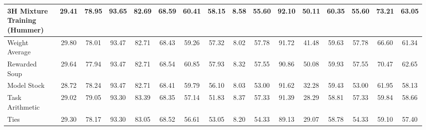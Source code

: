 \begin{table*}
{\begin{tabular}{lcccccccc|c|cc|cccc}
      3H Mixture Training (Hummer)           & 29.41                                     & 78.95            & 93.65                                      & 82.69                                  & 68.59                                 & 60.41                                   & 58.15                         & 8.58     & 55.60           & 92.10           & 50.11       & 60.35 & 55.60 & 73.21 & 63.05             \\ \midrule
      Weight Average                         & 29.80                                     & 78.01            & 93.47                                      & 82.71                                  & 68.43                                 & 59.26                                   & 57.32                         & 8.02     & 57.78           & 91.72           & 41.48       & 59.63 & 57.78 & 66.60 & 61.34             \\
      Rewarded Soup                          & 29.64                                     & 77.94            & 93.47                                      & 82.71                                  & 68.54                                 & 60.85                                   & 57.93                         & 8.32     & 57.55           & 90.86           & 50.08       & 59.93 & 57.55 & 70.47 & 62.65             \\
      Model Stock                            & 28.72                                     & 78.24            & 93.47                                      & 82.71                                  & 68.41                                 & 59.79                                   & 56.10                         & 8.03     & 53.00           & 91.62           & 32.28       & 59.43 & 53.00 & 61.95 & 58.13             \\
      Task Arithmetic                        & 29.02                                     & 79.05            & 93.30                                      & 83.39                                  & 68.35                                 & 57.14                                   & 51.83                         & 8.37     & 57.33           & 91.39           & 28.29       & 58.81 & 57.33 & 59.84 & 58.66             \\
      Ties                                   & 29.30                                     & 78.17            & 93.30                                      & 83.05                                  & 68.52                                 & 56.61                                   & 53.05                         & 8.20     & 54.33           & 89.13           & 29.07       & 58.78 & 54.33 & 59.10 & 57.40             \\

\end{tabular}}
\end{table*}
